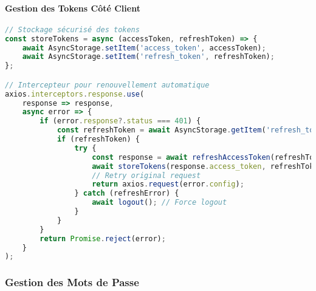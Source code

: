 \paragraph{Gestion des Tokens Côté Client}
\begin{lstlisting}[language=javascript]
// Stockage sécurisé des tokens
const storeTokens = async (accessToken, refreshToken) => {
    await AsyncStorage.setItem('access_token', accessToken);
    await AsyncStorage.setItem('refresh_token', refreshToken);
};

// Intercepteur pour renouvellement automatique
axios.interceptors.response.use(
    response => response,
    async error => {
        if (error.response?.status === 401) {
            const refreshToken = await AsyncStorage.getItem('refresh_token');
            if (refreshToken) {
                try {
                    const response = await refreshAccessToken(refreshToken);
                    await storeTokens(response.access_token, refreshToken);
                    // Retry original request
                    return axios.request(error.config);
                } catch (refreshError) {
                    await logout(); // Force logout
                }
            }
        }
        return Promise.reject(error);
    }
);
\end{lstlisting}

\subsubsection{Gestion des Mots de Passe}

